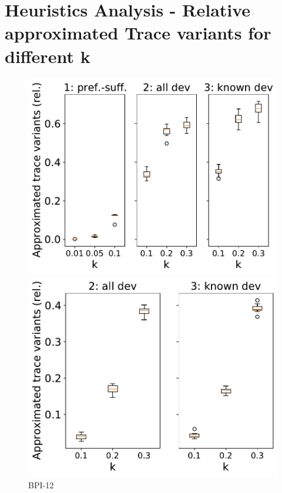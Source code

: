 \documentclass[landscape]{article}
\begin{document}
\vspace{1cm}
\section*{Heuristics Analysis - Relative approximated Trace variants for different k}
\begin{figure}[!htb]
	\centering
	\begin{minipage}{0.22\textwidth}
		\includegraphics[width=1.0\textwidth]{../BPI_Challenge_2012/BPI_Challenge_2012_approximation_comparison_approximated_variants.pdf}
		\caption{BPI-12}
	\end{minipage}
	\hfill
	\begin{minipage}{0.22\textwidth}
		\includegraphics[width=1.0\textwidth]{../Detail_Incident_Activity/Detail_Incident_Activity_approximation_comparison_approximated_variants.pdf}

\end{minipage}
\end{figure}
\end{document}
